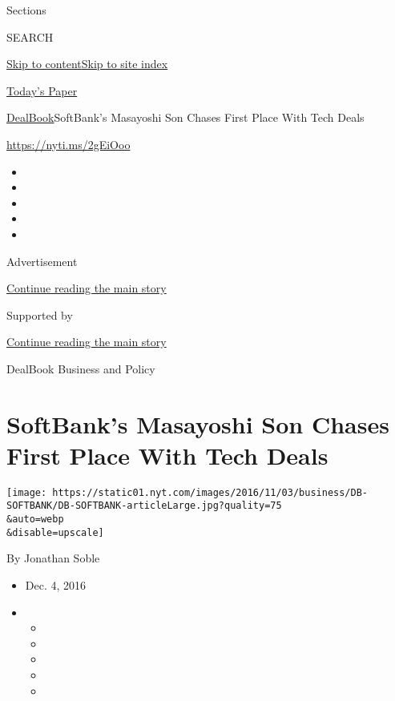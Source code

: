 Sections

SEARCH

\protect\hyperlink{site-content}{Skip to
content}\protect\hyperlink{site-index}{Skip to site index}

\href{https://myaccount.nytimes.com/auth/login?response_type=cookie\&client_id=vi}{}

\href{https://www.nytimes.com/section/todayspaper}{Today's Paper}

\href{/section/business/dealbook}{DealBook}\textbar{}SoftBank's
Masayoshi Son Chases First Place With Tech Deals

\url{https://nyti.ms/2gEiOoo}

\begin{itemize}
\item
\item
\item
\item
\item
\end{itemize}

Advertisement

\protect\hyperlink{after-top}{Continue reading the main story}

Supported by

\protect\hyperlink{after-sponsor}{Continue reading the main story}

DealBook Business and Policy

\hypertarget{softbanks-masayoshi-son-chases-first-place-with-tech-deals}{%
\section{SoftBank's Masayoshi Son Chases First Place With Tech
Deals}\label{softbanks-masayoshi-son-chases-first-place-with-tech-deals}}

\texttt{[image: https://static01.nyt.com/images/2016/11/03/business/DB-SOFTBANK/DB-SOFTBANK-articleLarge.jpg?quality=75\\\&auto=webp\\\&disable=upscale]}

By Jonathan Soble

\begin{itemize}
\item
  Dec. 4, 2016
\item
  \begin{itemize}
  \item
  \item
  \item
  \item
  \item
  \end{itemize}
\end{itemize}

